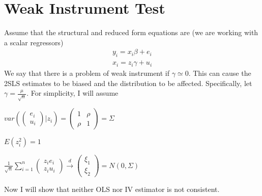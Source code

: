 \section{Weak Instrument Test}
Assume that the structural and reduced form equations are (we are working with a scalar regressors)
\begin{gather*}
y_i = x_i\beta+ e_i \\ x_i=z_i\gamma+u_i
\end{gather*}
We say that there is a problem of weak instrument if $\gamma\simeq0$. This can cause the 2SLS estimates to be biased and the distribution to be affected. Specifically, let $\gamma=\frac{\mu}{\sqrt{n}}$. For simplicity, I will assume
\begin{itemize}
\footnotesize{\item $var\left(\begin{pmatrix}e_i \\ u_i \end{pmatrix}| z_i\right)=\begin{pmatrix}1 & \rho \\ \rho &1\end{pmatrix}=\Sigma$
\item $E(z_i^2)=1$
\item $\frac{1}{\sqrt{n}}\sum_{i=1}^n\begin{pmatrix}z_ie_i \\ z_iu_i\end{pmatrix}\xrightarrow{d}\begin{pmatrix}\xi_1 \\ \xi_2\end{pmatrix}=N(0,\Sigma)$}\normalsize
\end{itemize}
Now I will show that neither OLS nor IV estimator is not consistent. 
